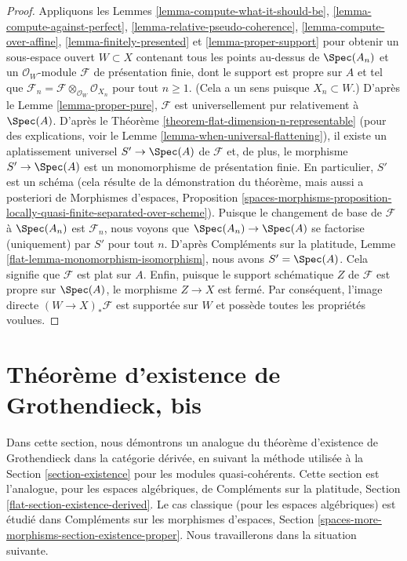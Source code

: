 \begin{proof}
Appliquons les Lemmes \ref{lemma-compute-what-it-should-be},
\ref{lemma-compute-against-perfect},
\ref{lemma-relative-pseudo-coherence},
\ref{lemma-compute-over-affine},
\ref{lemma-finitely-presented} et
\ref{lemma-proper-support}
pour obtenir un sous-espace ouvert $W \subset X$ contenant tous les points
au-dessus de $\Spec(A_n)$
et un $\mathcal{O}_W$-module $\mathcal{F}$ de présentation finie,
dont le support est propre sur $A$ et tel que
$\mathcal{F}_n = \mathcal{F} \otimes_{\mathcal{O}_W} \mathcal{O}_{X_n}$
pour tout $n \geq 1$. (Cela a un sens puisque $X_n \subset W$.)
D'après le Lemme \ref{lemma-proper-pure}, $\mathcal{F}$
est universellement pur relativement à $\Spec(A)$.
D'après le Théorème \ref{theorem-flat-dimension-n-representable}
(pour des explications, voir le Lemme \ref{lemma-when-universal-flattening}),
il existe un aplatissement universel $S' \to \Spec(A)$
de $\mathcal{F}$ et, de plus, le morphisme $S' \to \Spec(A)$
est un monomorphisme de présentation finie.
En particulier, $S'$ est un schéma (cela résulte de la démonstration
du théorème, mais aussi a posteriori de
Morphismes d'espaces, Proposition
\ref{spaces-morphisms-proposition-locally-quasi-finite-separated-over-scheme}).
Puisque le changement de base de $\mathcal{F}$ à $\Spec(A_n)$
est $\mathcal{F}_n$, nous voyons que $\Spec(A_n) \to \Spec(A)$
se factorise (uniquement) par $S'$ pour tout $n$.
D'après Compléments sur la platitude, Lemme \ref{flat-lemma-monomorphism-isomorphism},
nous avons $S' = \Spec(A)$.
Cela signifie que $\mathcal{F}$ est plat sur $A$.
Enfin, puisque le support schématique $Z$ de $\mathcal{F}$
est propre sur $\Spec(A)$, le morphisme $Z \to X$ est fermé.
Par conséquent, l'image directe $(W \to X)_*\mathcal{F}$ est supportée
sur $W$ et possède toutes les propriétés voulues.
\end{proof}







\section{Théorème d'existence de Grothendieck, bis}
\label{section-existence-derived}

\noindent
Dans cette section, nous démontrons un analogue du théorème d'existence de Grothendieck
dans la catégorie dérivée, en suivant la méthode utilisée à la
Section \ref{section-existence} pour les modules quasi-cohérents.
Cette section est l'analogue, pour les espaces algébriques, de
Compléments sur la platitude, Section \ref{flat-section-existence-derived}.
Le cas classique (pour les espaces algébriques)
est étudié dans Compléments sur les morphismes d'espaces, Section
\ref{spaces-more-morphisms-section-existence-proper}.
Nous travaillerons dans la situation suivante.

